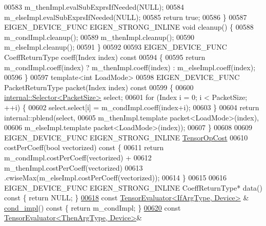 \begin{DoxyCode}
00583     m\_thenImpl.evalSubExprsIfNeeded(NULL);
00584     m\_elseImpl.evalSubExprsIfNeeded(NULL);
00585     \textcolor{keywordflow}{return} \textcolor{keyword}{true};
00586   \}
00587   EIGEN\_DEVICE\_FUNC EIGEN\_STRONG\_INLINE \textcolor{keywordtype}{void} cleanup() \{
00588     m\_condImpl.cleanup();
00589     m\_thenImpl.cleanup();
00590     m\_elseImpl.cleanup();
00591   \}
00592 
00593   EIGEN\_DEVICE\_FUNC CoeffReturnType coeff(Index index)\textcolor{keyword}{ const}
00594 \textcolor{keyword}{  }\{
00595     \textcolor{keywordflow}{return} m\_condImpl.coeff(index) ? m\_thenImpl.coeff(index) : m\_elseImpl.coeff(index);
00596   \}
00597   \textcolor{keyword}{template}<\textcolor{keywordtype}{int} LoadMode>
00598   EIGEN\_DEVICE\_FUNC PacketReturnType packet(Index index)\textcolor{keyword}{ const}
00599 \textcolor{keyword}{  }\{
00600     \hyperlink{struct_eigen_1_1internal_1_1_selector}{internal::Selector<PacketSize>} select;
00601     \textcolor{keywordflow}{for} (Index i = 0; i < PacketSize; ++i) \{
00602       select.select[i] = m\_condImpl.coeff(index+i);
00603     \}
00604     \textcolor{keywordflow}{return} internal::pblend(select,
00605                             m\_thenImpl.template packet<LoadMode>(index),
00606                             m\_elseImpl.template packet<LoadMode>(index));
00607   \}
00608 
00609   EIGEN\_DEVICE\_FUNC EIGEN\_STRONG\_INLINE \hyperlink{class_eigen_1_1_tensor_op_cost}{TensorOpCost}
00610   costPerCoeff(\textcolor{keywordtype}{bool} vectorized)\textcolor{keyword}{ const }\{
00611     \textcolor{keywordflow}{return} m\_condImpl.costPerCoeff(vectorized) +
00612            m\_thenImpl.costPerCoeff(vectorized)
00613         .cwiseMax(m\_elseImpl.costPerCoeff(vectorized));
00614   \}
00615 
00616   EIGEN\_DEVICE\_FUNC EIGEN\_STRONG\_INLINE CoeffReturnType* data()\textcolor{keyword}{ const }\{ \textcolor{keywordflow}{return} NULL; \}
\hyperlink{struct_eigen_1_1_tensor_evaluator_3_01const_01_tensor_select_op_3_01_if_arg_type_00_01_then_arg_346b931156fad56ae8aa875afe41cb55_a6f8fea23435b866049d90dadd25955f3}{00618}   \textcolor{keyword}{const} \hyperlink{struct_eigen_1_1_tensor_evaluator}{TensorEvaluator<IfArgType, Device>} & 
      \hyperlink{struct_eigen_1_1_tensor_evaluator_3_01const_01_tensor_select_op_3_01_if_arg_type_00_01_then_arg_346b931156fad56ae8aa875afe41cb55_a6f8fea23435b866049d90dadd25955f3}{cond\_impl}()\textcolor{keyword}{ const }\{ \textcolor{keywordflow}{return} m\_condImpl; \}
\hyperlink{struct_eigen_1_1_tensor_evaluator_3_01const_01_tensor_select_op_3_01_if_arg_type_00_01_then_arg_346b931156fad56ae8aa875afe41cb55_aba02423503271daeef9165ec50b3b93d}{00620}   \textcolor{keyword}{const} \hyperlink{struct_eigen_1_1_tensor_evaluator}{TensorEvaluator<ThenArgType, Device>}& 

\end{DoxyCode}
